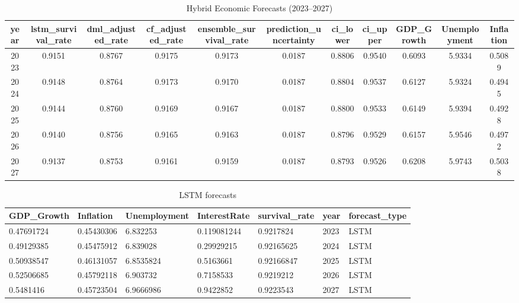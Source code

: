 \begin{table}[H]
\centering
\caption{Hybrid Economic Forecasts (2023--2027)}
\begin{tabular}{|c|c|c|c|c|c|c|c|c|c|c|}
\hline
\textbf{year} & \textbf{lstm\_survival\_rate} & \textbf{dml\_adjusted\_rate} & \textbf{cf\_adjusted\_rate} & \textbf{ensemble\_survival\_rate} & \textbf{prediction\_uncertainty} & \textbf{ci\_lower} & \textbf{ci\_upper} & \textbf{GDP\_Growth} & \textbf{Unemployment} & \textbf{Inflation} \\
\hline
2023 & 0.9151 & 0.8767 & 0.9175 & 0.9173 & 0.0187 & 0.8806 & 0.9540 & 0.6093 & 5.9334 & 0.5089 \\
\hline
2024 & 0.9148 & 0.8764 & 0.9173 & 0.9170 & 0.0187 & 0.8804 & 0.9537 & 0.6127 & 5.9324 & 0.4945 \\
\hline
2025 & 0.9144 & 0.8760 & 0.9169 & 0.9167 & 0.0187 & 0.8800 & 0.9533 & 0.6149 & 5.9394 & 0.4928 \\
\hline
2026 & 0.9140 & 0.8756 & 0.9165 & 0.9163 & 0.0187 & 0.8796 & 0.9529 & 0.6157 & 5.9546 & 0.4972 \\
\hline
2027 & 0.9137 & 0.8753 & 0.9161 & 0.9159 & 0.0187 & 0.8793 & 0.9526 & 0.6208 & 5.9743 & 0.5038 \\
\hline
\end{tabular}
\end{table}


\begin{table}[H]
\centering
\caption{LSTM forecasts}
\begin{tabular}{|l|l|l|l|l|l|l|}
\hline
GDP\_Growth & Inflation & Unemployment & InterestRate & survival\_rate & year & forecast\_type \\
\hline
0.47691724 & 0.45430306 & 6.832253 & 0.119081244 & 0.9217824 & 2023 & LSTM \\
0.49129385 & 0.45475912 & 6.839028 & 0.29929215 & 0.92165625 & 2024 & LSTM \\
0.50938547 & 0.46131057 & 6.8535824 & 0.5163661 & 0.92166847 & 2025 & LSTM \\
0.52506685 & 0.45792118 & 6.903732 & 0.7158533 & 0.9219212 & 2026 & LSTM \\
0.5481416 & 0.45723504 & 6.9666986 & 0.9422852 & 0.9223543 & 2027 & LSTM \\
\hline
\end{tabular}
\end{table}

